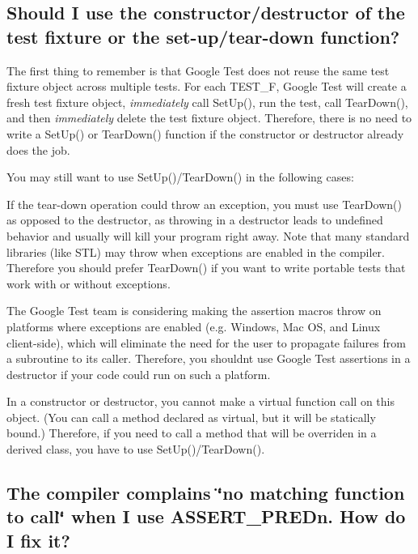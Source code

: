 \subsection*{Should I use the constructor/destructor of the test fixture or the set-\/up/tear-\/down function?}

The first thing to remember is that Google Test does not reuse the same test fixture object across multiple tests. For each {\ttfamily T\+E\+S\+T\+\_\+F}, Google Test will create a fresh test fixture object, {\itshape immediately} call {\ttfamily Set\+Up()}, run the test, call {\ttfamily Tear\+Down()}, and then {\itshape immediately} delete the test fixture object. Therefore, there is no need to write a {\ttfamily Set\+Up()} or {\ttfamily Tear\+Down()} function if the constructor or destructor already does the job.

You may still want to use {\ttfamily Set\+Up()/\+Tear\+Down()} in the following cases\+:
\begin{DoxyItemize}
\item If the tear-\/down operation could throw an exception, you must use {\ttfamily Tear\+Down()} as opposed to the destructor, as throwing in a destructor leads to undefined behavior and usually will kill your program right away. Note that many standard libraries (like S\+TL) may throw when exceptions are enabled in the compiler. Therefore you should prefer {\ttfamily Tear\+Down()} if you want to write portable tests that work with or without exceptions.
\item The Google Test team is considering making the assertion macros throw on platforms where exceptions are enabled (e.\+g. Windows, Mac OS, and Linux client-\/side), which will eliminate the need for the user to propagate failures from a subroutine to its caller. Therefore, you shouldn\textquotesingle{}t use Google Test assertions in a destructor if your code could run on such a platform.
\item In a constructor or destructor, you cannot make a virtual function call on this object. (You can call a method declared as virtual, but it will be statically bound.) Therefore, if you need to call a method that will be overriden in a derived class, you have to use {\ttfamily Set\+Up()/\+Tear\+Down()}.
\end{DoxyItemize}

\subsection*{The compiler complains \char`\"{}no matching function to call\char`\"{} when I use A\+S\+S\+E\+R\+T\+\_\+\+P\+R\+E\+Dn. How do I fix it?}

